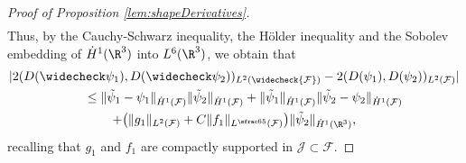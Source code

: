 \begin{proof}[Proof of Proposition \ref{lem:shapeDerivatives}]
\begin{align*}
\end{align*}
Thus, by the Cauchy-Schwarz inequality, the Hölder inequality and the Sobolev embedding of $\dot H^1 (\R^3)$ into $L^6 (\R^3)$, we obtain that
\begin{multline} \label{midi1}
|2(D(\widecheck \psi_1), D(\widecheck \psi_2))_{L^2(\widecheck{\mathcal F})} - 2(D(\psi_1), D(\psi_2))_{L^2(\mathcal F)}|\\
\hspace*{.6cm}\leq \|\tilde \psi_1 - \psi_1\|_{\dot H^1(\mathcal F)} \|\tilde \psi_2\|_{\dot H^1(\mathcal F)} + \|\tilde \psi_1\|_{\dot H^1(\mathcal F)} \|\tilde \psi_2 - \psi_2\|_{\dot H^1(\mathcal F)}\\
+ \bigl(\|g_1\|_{L^2(\mathcal F)} + C \|f_1\|_{L^{\sfrac 6 5 }(\mathcal F)}\bigr) \|\tilde \psi_2\|_{\dot H^1 (\R^3)},
\end{multline}
recalling that $g_1$ and $f_1$ are compactly supported in $ \mathcal J \subset \mathcal F$.


\end{proof}
